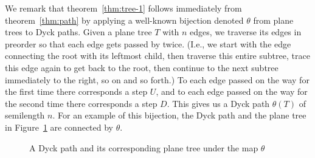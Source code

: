 \documentclass[reqno]{amsart}
\numberwithin{equation}{section}
\theoremstyle{definition}
\theoremstyle{named}
\begin{document}
We remark that theorem~\ref{thm:tree-1} follows immediately from theorem~\ref{thm:path} by applying a well-known bijection denoted $\theta$ from plane trees to Dyck paths. Given a plane tree $T$ with $n$ edges, we traverse its edges in preorder so that each edge gets passed by twice. (I.e., we start with the edge connecting the root with its leftmost child, then traverse this entire subtree, trace this edge again to get back to the root, then continue to the next subtree immediately to the right, so on and so forth.) To each edge passed on the way for the first time there corresponds a step $U$, and to each edge passed on the way for the second time there corresponds a step $D$. This gives us a Dyck path $\theta(T)$ of semilength $n$. For an example of this bijection, the Dyck path and the plane tree in Figure~\ref{fig:Dyck-tree} are connected by $\theta$.

\begin{figure}[!ht]
	\centering
	\hfill
	\caption{A Dyck path and its corresponding plane tree under the map $\theta$}\label{fig:Dyck-tree}
\end{figure}
\end{document}
